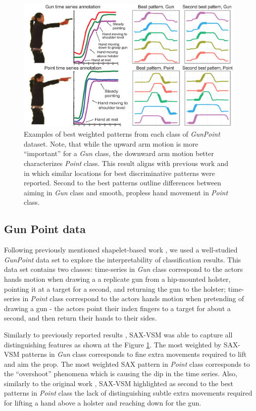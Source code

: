 \documentclass{llncs}
\newcommand{\myfigureshrinker}{\vspace{-1cm}}
\begin{document}
\begin{figure}[t]
   \myfigureshrinker
   \centering
   \includegraphics[width=115mm]{figures/gun-point.eps}
   \caption{Examples of best weighted patterns from each class of \textit{GunPoint} dataset. 
   Note, that while the upward arm motion is more ``important'' for a \textit{Gun} class, 
   the downward arm motion better characterizes \textit{Point} class. 
   This result aligns with previous work \cite{shapelet} and \cite{bagnal} in which similar 
   locations for best discriminative patterns were reported. 
   Second to the best patterns outline differences between aiming in \textit{Gun} class and
   smooth, propless hand movement in \textit{Point} class.
   }
   \label{fig:shapelet-like-patterns}
\end{figure}

\subsection{Gun Point data}
Following previously mentioned shapelet-based work \cite{shapelet, bagnal}, 
we used a well-studied \textit{GunPoint} data set \cite{gun} to explore the 
interpretability of classification results. This data set contains two classes: 
time-series in \textit{Gun} class correspond to the actors hands motion when drawing a 
a replicate gun from a hip-mounted holster, pointing it at a target for a second,
and returning the gun to the holster; 
time-series in \textit{Point} class correspond to the actors hands motion when pretending
of drawing a gun - the actors point their index fingers to a target for about a second, 
and then return their hands to their sides. 

Similarly to previously reported results \cite{shapelet, bagnal}, 
SAX-VSM was able to capture all distinguishing features as shown at the 
Figure \ref{fig:shapelet-like-patterns}. The most weighted by SAX-VSM patterns in 
\textit{Gun} class corresponds to fine extra movements required to lift and aim the prop. 
The most weighted SAX pattern in \textit{Point} class corresponds to the ``overshoot''
phenomena which is causing the dip in the time series. 
Also, similarly to the original work \cite{gun}, SAX-VSM highlighted as second to the best
patterns in \textit{Point} class the lack of distinguishing subtle extra movements required
for lifting a hand above a holster and reaching down for the gun.
\end{document}
